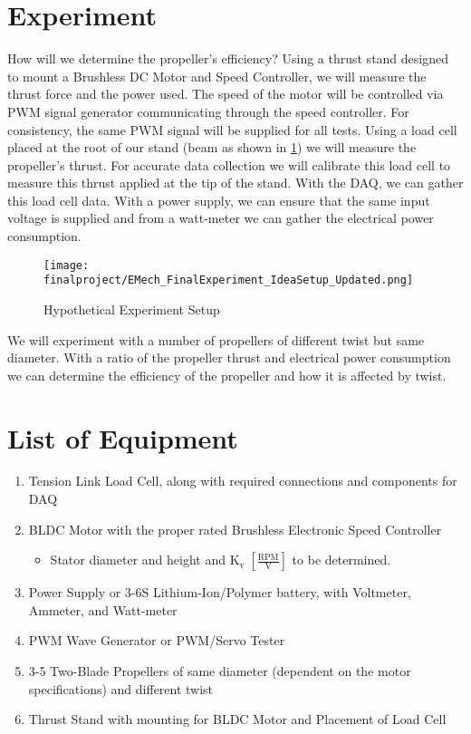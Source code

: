 \documentclass{article}
\begin{document}
\section{Experiment}
How will we determine the propeller's efficiency? Using a thrust stand designed to mount a Brushless DC Motor and Speed Controller, we will measure the thrust force and the power used. The speed of the motor will be controlled via PWM signal generator communicating through the speed controller. For consistency, the same PWM signal will be supplied for all tests. Using a load cell placed at the root of our stand (beam as shown in \ref{fig:finalsetup}) we will measure the propeller's thrust. For accurate data collection we will calibrate this load cell to measure this thrust applied at the tip of the stand. With the DAQ, we can gather this load cell data.  With a power supply, we can ensure that the same input voltage is supplied and from a watt-meter we can gather the electrical power consumption.
\begin{figure}[H]
    \centering
    \texttt{[image: finalproject/EMech\_FinalExperiment\_IdeaSetup\_Updated.png]}
    \caption{Hypothetical Experiment Setup}
    \label{fig:finalsetup}
\end{figure}
We will experiment with a number of propellers of different twist but same diameter. With a ratio of the propeller thrust and electrical power consumption we can determine the efficiency of the propeller and how it is affected by twist.
\section{List of Equipment}
\begin{enumerate}
    \item Tension Link Load Cell, along with required connections and components for DAQ 
    \item BLDC Motor with the proper rated Brushless Electronic Speed Controller 
    \begin{itemize}
        \item Stator diameter and height and $\text{K}_{\text{v}}\; [\frac{
        \text{RPM}}{\text{V}}]$ to be determined.
    \end{itemize}
    \item Power Supply or 3-6S Lithium-Ion/Polymer battery, with Voltmeter, Ammeter, and Watt-meter
    \item PWM Wave Generator or PWM/Servo Tester
    \item 3-5 Two-Blade Propellers of same diameter (dependent on the motor specifications) and different twist
    \item Thrust Stand with mounting for BLDC Motor and Placement of Load Cell
\end{enumerate}
\end{document}
